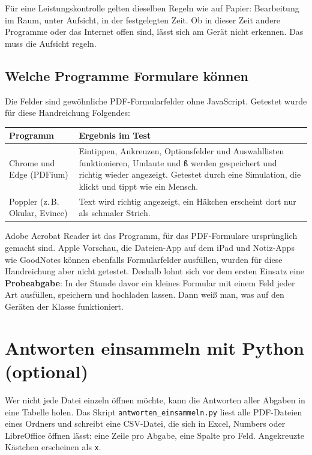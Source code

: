 \begin{Form}
Für eine Leistungskontrolle gelten dieselben Regeln wie auf Papier:
Bearbeitung im Raum, unter Aufsicht, in der festgelegten Zeit. Ob in dieser
Zeit andere Programme oder das Internet offen sind, lässt sich am Gerät nicht
erkennen. Das muss die Aufsicht regeln.

\subsection{Welche Programme Formulare können}

Die Felder sind gewöhnliche PDF-Formularfelder ohne JavaScript. Getestet
wurde für diese Handreichung Folgendes:

\renewcommand{\arraystretch}{1.3}
\begin{tabular}{p{4.6cm} p{11cm}}
	\toprule
	\textbf{Programm} & \textbf{Ergebnis im Test} \\
	\midrule
	Chrome und Edge (PDFium) & Eintippen, Ankreuzen, Optionsfelder und
	Auswahllisten funktionieren, Umlaute und \texttt{ß} werden gespeichert und
	richtig wieder angezeigt. Getestet durch eine Simulation, die klickt und
	tippt wie ein Mensch. \\
	Poppler (z.\,B. Okular, Evince) & Text wird richtig angezeigt, ein Häkchen
	erscheint dort nur als schmaler Strich. \\
	\bottomrule
\end{tabular}

Adobe Acrobat Reader ist das Programm, für das PDF-Formulare ursprünglich
gemacht sind. Apple Vorschau, die Dateien-App auf dem iPad und
Notiz-Apps wie GoodNotes können ebenfalls Formularfelder ausfüllen, wurden für
diese Handreichung aber nicht getestet. Deshalb lohnt sich vor dem ersten
Einsatz eine \textbf{Probeabgabe}: In der Stunde davor ein kleines Formular
mit einem Feld jeder Art ausfüllen, speichern und hochladen lassen. Dann
weiß man, was auf den Geräten der Klasse funktioniert.



\section{Antworten einsammeln mit Python (optional)}

Wer nicht jede Datei einzeln öffnen möchte, kann die Antworten aller Abgaben
in eine Tabelle holen. Das Skript \texttt{antworten\_einsammeln.py} liest alle
PDF-Dateien eines Ordners und schreibt eine CSV-Datei, die sich in Excel,
Numbers oder LibreOffice öffnen lässt: eine Zeile pro Abgabe, eine Spalte pro
Feld. Angekreuzte Kästchen erscheinen als \texttt{x}.


\end{Form}
